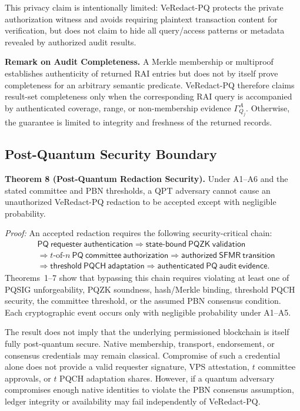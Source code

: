 \documentclass[lettersize,journal]{IEEEtran}
\begin{document}
This privacy claim is intentionally limited: VeRedact-PQ protects the
private authorization witness and avoids requiring plaintext
transaction content for verification, but does not claim to hide all
query/access patterns or metadata revealed by authorized audit results.

\medskip
\noindent\textbf{Remark on Audit Completeness.}
A Merkle membership or multiproof establishes authenticity of returned
RAI entries but does not by itself prove completeness for an arbitrary
semantic predicate. VeRedact-PQ therefore claims result-set
completeness only when the corresponding RAI query is accompanied by
authenticated coverage, range, or non-membership evidence
$\Gamma_{Q_j}^{A}$. Otherwise, the guarantee is limited to integrity
and freshness of the returned records.

\subsection{Post-Quantum Security Boundary}

\textbf{Theorem 8 (Post-Quantum Redaction Security).}
Under A1--A6 and the stated committee and PBN thresholds, a QPT
adversary cannot cause an unauthorized VeRedact-PQ redaction to be
accepted except with negligible probability.

\emph{Proof:}
An accepted redaction requires the following security-critical chain:
\begin{equation}
\begin{split}
&\mathsf{PQ\ requester\ authentication}
\Rightarrow
\mathsf{state\mbox{-}bound\ PQZK\ validation}\\
&\Rightarrow
t\text{-of-}n\ \mathsf{PQ\ committee\ authorization}
\Rightarrow
\mathsf{authorized\ SFMR\ transition}\\
&\Rightarrow
\mathsf{threshold\ PQCH\ adaptation}
\Rightarrow
\mathsf{authenticated\ PQ\ audit\ evidence}.
\end{split}
\label{eq:sec_pq_chain}
\end{equation}
Theorems~1--7 show that bypassing this chain requires violating at
least one of PQSIG unforgeability, PQZK soundness, hash/Merkle binding,
threshold PQCH security, the committee threshold, or the assumed PBN
consensus condition. Each cryptographic event occurs only with
negligible probability under A1--A5.

The result does not imply that the underlying permissioned blockchain
is itself fully post-quantum secure. Native membership, transport,
endorsement, or consensus credentials may remain classical. Compromise
of such a credential alone does not provide a valid requester
signature, VPS attestation, $t$ committee approvals, or $t$ PQCH
adaptation shares. However, if a quantum adversary compromises enough
native identities to violate the PBN consensus assumption, ledger
integrity or availability may fail independently of VeRedact-PQ.
\end{document}
